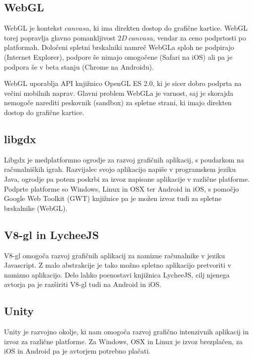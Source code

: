 \documentclass[a4paper,11pt]{article}
\begin{document}
\subsection{WebGL\cite{webgl}}

WebGL je kontekst $canvas$a, ki ima direkten dostop do grafične kartice. WebGL torej popravlja glavno pomankljivost  $2D\ canvas$a, vendar za ceno podprtosti po platformah. Določeni spletni brskalniki namreč WebGLa sploh ne podpirajo (Internet Explorer), podpore še nimajo omogočene (Safari na iOS) ali pa je podpora še v beta stanju (Chrome na Androidu).

WebGL uporablja API knjižnico OpenGL ES 2.0, ki je sicer dobro podprta na večini mobilnih naprav. Glavni problem WebGLa je varnost, saj je skorajda nemogoče narediti peskovnik (sandbox) za spletne strani, ki imajo direkten dostop do grafične kartice.

\subsection{libgdx\cite{libgdx}}

Libgdx je medplatformno ogrodje za razvoj grafičnih aplikacij, s poudarkom na računalniških igrah. Razvijalec svojo aplikacijo napiše v programskem jeziku Java, ogrodje pa potem poskrbi za izvoz napisane aplikacije v različne platforme. Podprte platforme so Windows, Linux in OSX ter Android in iOS, s pomočjo Google Web Toolkit (GWT) knjižnice pa je možen izvoz tudi za spletne brskalnike (WebGL).

\subsection{V8-gl\cite{v8gl} in LycheeJS\cite{lycheejs}}

V8-gl omogoča razvoj grafičnih aplikacij za namizne računalnike v jeziku Javascript. Z malo abstrakcije je tako možno spletno aplikacijo pretvoriti v namizno aplikacijo. Delo lahko poenostavi knjižnica LycheeJS, cilj njenega avtorja pa je razširiti V8-gl tudi na Android in iOS.

\subsection{Unity\cite{unity}}

Unity je razvojno okolje, ki nam omogoča razvoj grafično intenzivnih aplikacij in izvoz za različne platforme. Za Windows, OSX in Linux je izvoz brezplačen, za iOS in Android pa je avtorjem potrebno plačati.
\end{document}
